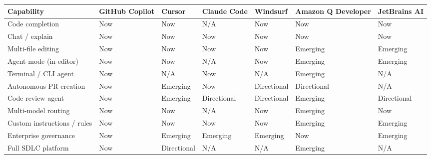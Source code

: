 \documentclass[
  a4paper,
  DIV=11,
  numbers=noendperiod]{scrreprt}
\newcounter{none} %
\begin{document}
\begin{landscape}

{\def\LTcaptype{none} %
\begin{longtable}[]{@{}
  >{\raggedright\arraybackslash}p{}
  >{\raggedright\arraybackslash}p{}
  >{\raggedright\arraybackslash}p{}
  >{\raggedright\arraybackslash}p{}
  >{\raggedright\arraybackslash}p{}
  >{\raggedright\arraybackslash}p{}
  >{\raggedright\arraybackslash}p{}@{}}
\toprule\noalign{}
\begin{minipage}[b]{\linewidth}\raggedright
Capability
\end{minipage} & \begin{minipage}[b]{\linewidth}\raggedright
GitHub Copilot
\end{minipage} & \begin{minipage}[b]{\linewidth}\raggedright
Cursor
\end{minipage} & \begin{minipage}[b]{\linewidth}\raggedright
Claude Code
\end{minipage} & \begin{minipage}[b]{\linewidth}\raggedright
Windsurf
\end{minipage} & \begin{minipage}[b]{\linewidth}\raggedright
Amazon Q Developer
\end{minipage} & \begin{minipage}[b]{\linewidth}\raggedright
JetBrains AI
\end{minipage} \\
\midrule\noalign{}
\endhead
\bottomrule\noalign{}
\endlastfoot
Code completion & Now & Now & N/A & Now & Now & Now \\
Chat / explain & Now & Now & Now & Now & Now & Now \\
Multi-file editing & Now & Now & Now & Now & Emerging & Emerging \\
Agent mode (in-editor) & Now & Now & N/A & Now & Emerging & Emerging \\
Terminal / CLI agent & Now & N/A & Now & N/A & Emerging & N/A \\
Autonomous PR creation & Now & Emerging & Now & Directional &
Directional & N/A \\
Code review agent & Now & Emerging & Directional & Directional &
Emerging & Directional \\
Multi-model routing & Now & Now & N/A & Now & Emerging & Now \\
Custom instructions / rules & Now & Now & Now & Now & Emerging &
Emerging \\
Enterprise governance & Now & Emerging & Emerging & Emerging & Now &
Emerging \\
Full SDLC platform & Now & Directional & N/A & N/A & Emerging & N/A \\
\end{longtable}
}

\end{landscape}
\end{document}

